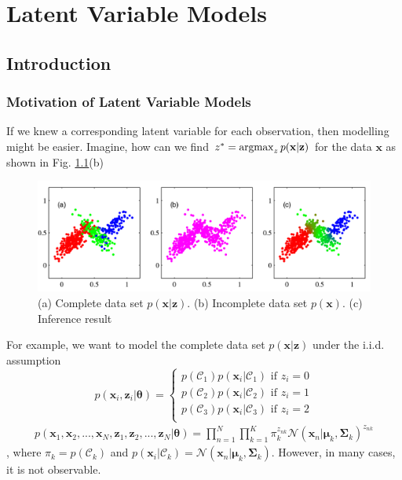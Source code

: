 \chapter{Latent Variable Models}
\section{Introduction}
\subsection{Motivation of Latent Variable Models}
\label{sec:intro_motivation}
If we knew a corresponding latent variable for each observation, then modelling might be easier. Imagine, how can we find $z^* = \operatorname*{\operatorname{argmax}}_{z} p(\mathbf{x|z})$ for the data $\mathbf{x}$ as shown in Fig. \ref{fig:clusters}(b)

\begin{figure}[h]
	\begin{center}			
		\includegraphics[scale=0.25]{./images/generative/latent.png}
	\end{center}
	\caption{(a) Complete data set $p(\mathbf{x|z})$. (b) Incomplete data set $p(\mathbf{x})$. (c) Inference result}
	\label{fig:clusters}
\end{figure}
For example, we want to model the complete data set $p(\mathbf{x|z})$ under the i.i.d. assumption 
\begin{equation*}
p(\mathbf{x}_i, \mathbf{z}_i|\boldsymbol{\theta}) = 
\begin{cases}
p(\mathcal{C}_1)p(\mathbf{x}_i|\mathcal{C}_1) \textrm{ if } z_i=0\\
p(\mathcal{C}_2)p(\mathbf{x}_i|\mathcal{C}_2) \textrm{ if } z_i=1\\
p(\mathcal{C}_3)p(\mathbf{x}_i|\mathcal{C}_3) \textrm{ if } z_i=2\\
\end{cases}
\end{equation*}
\begin{align*}
p(\mathbf{x}_1, \mathbf{x}_2,...,\mathbf{x}_N, \mathbf{z}_1, \mathbf{z}_2, ..., \mathbf{z}_N|\boldsymbol{\theta}) = \prod_{n=1}^{N}\prod_{k=1}^{K}\pi_k^{z_{nk}}\mathcal{N}(\mathbf{x}_n|\boldsymbol{\mu}_k, \boldsymbol{\Sigma}_k)^{z_{nk}}
\end{align*}
, where $\pi_k=p(\mathcal{C}_k)$ and $p(\mathbf{x}_i|\mathcal{C}_k)=\mathcal{N}(\mathbf{x}_n|\boldsymbol{\mu}_k, \boldsymbol{\Sigma}_k)$. However, in many cases, it is not observable. 

